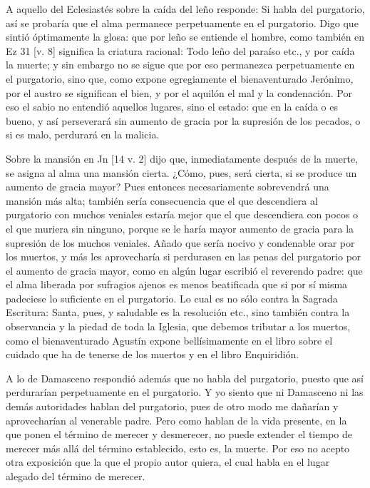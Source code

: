 A aquello del Eclesiastés sobre la caída del leño responde: Si habla del purgatorio, así se probaría que el alma permanece perpetuamente en el purgatorio. Digo que sintió óptimamente la glosa: que por leño se entiende el hombre, como también en Ez 31 [v. 8] significa la criatura racional: Todo leño del paraíso etc., y por caída la muerte; y sin embargo no se sigue que por eso permanezca perpetuamente en el purgatorio, sino que, como expone egregiamente el bienaventurado Jerónimo, por el austro se significan el bien, y por el aquilón el mal y la condenación. Por eso el sabio no entendió aquellos lugares, sino el estado: que en la caída o es bueno, y así perseverará sin aumento de gracia por la supresión de los pecados, o si es malo, perdurará en la malicia.

Sobre la mansión en Jn [14 v. 2] dijo que, inmediatamente después de la muerte, se asigna al alma una mansión cierta. ¿Cómo, pues, será cierta, si se produce un aumento de gracia mayor? Pues entonces necesariamente sobrevendrá una mansión más alta; también sería consecuencia que el que descendiera al purgatorio con muchos veniales estaría mejor que el que descendiera con pocos o el que muriera sin ninguno, porque se le haría mayor aumento de gracia para la supresión de los muchos veniales. Añado que sería nocivo y condenable orar por los muertos, y más les aprovecharía si perdurasen en las penas del purgatorio por el aumento de gracia mayor, como en algún lugar escribió el reverendo padre: que el alma liberada por sufragios ajenos es menos beatificada que si por sí misma padeciese lo suficiente en el purgatorio. Lo cual es no sólo contra la Sagrada \marginpar{\small[337]} Escritura: Santa, pues, y saludable es la resolución etc., sino también contra la observancia y la piedad de toda la Iglesia, que debemos tributar a los muertos, como el bienaventurado Agustín expone bellísimamente en el libro sobre el cuidado que ha de tenerse de los muertos y en el libro Enquiridión.

A lo de Damasceno respondió además que no habla del purgatorio, puesto que así perdurarían perpetuamente en el purgatorio. Y yo siento que ni Damasceno ni las demás autoridades hablan del purgatorio, pues de otro modo me dañarían y aprovecharían al venerable padre. Pero como hablan de la vida presente, en la que ponen el término de merecer y desmerecer, no puede extender el tiempo de merecer más allá del término establecido, esto es, la muerte. Por eso no acepto otra exposición que la que el propio autor quiera, el cual habla en el lugar alegado del término de merecer.

